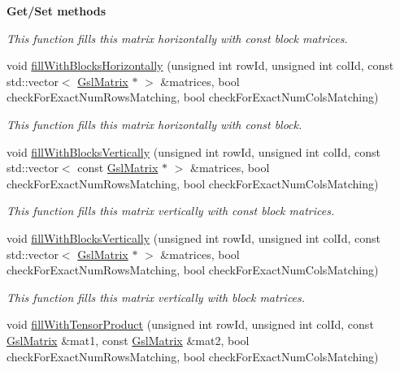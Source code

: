 \begin{Indent}{\bf Get/\-Set methods}
\begin{DoxyCompactItemize}
\begin{DoxyCompactList}\small\item\em This function fills {\ttfamily this} matrix horizontally with const block matrices. \end{DoxyCompactList}\item 
void \hyperlink{class_q_u_e_s_o_1_1_gsl_matrix_ab08b0373565e9c5ffdf7f3b97d2a05c0}{fill\-With\-Blocks\-Horizontally} (unsigned int row\-Id, unsigned int col\-Id, const std\-::vector$<$ \hyperlink{class_q_u_e_s_o_1_1_gsl_matrix}{Gsl\-Matrix} $\ast$ $>$ \&matrices, bool check\-For\-Exact\-Num\-Rows\-Matching, bool check\-For\-Exact\-Num\-Cols\-Matching)
\begin{DoxyCompactList}\small\item\em This function fills {\ttfamily this} matrix horizontally with const block. \end{DoxyCompactList}\item 
void \hyperlink{class_q_u_e_s_o_1_1_gsl_matrix_a872a7a51e6efe08c64eee627572e2505}{fill\-With\-Blocks\-Vertically} (unsigned int row\-Id, unsigned int col\-Id, const std\-::vector$<$ const \hyperlink{class_q_u_e_s_o_1_1_gsl_matrix}{Gsl\-Matrix} $\ast$ $>$ \&matrices, bool check\-For\-Exact\-Num\-Rows\-Matching, bool check\-For\-Exact\-Num\-Cols\-Matching)
\begin{DoxyCompactList}\small\item\em This function fills {\ttfamily this} matrix vertically with const block matrices. \end{DoxyCompactList}\item 
void \hyperlink{class_q_u_e_s_o_1_1_gsl_matrix_adc6102e609373e99b699a666bc3c0aae}{fill\-With\-Blocks\-Vertically} (unsigned int row\-Id, unsigned int col\-Id, const std\-::vector$<$ \hyperlink{class_q_u_e_s_o_1_1_gsl_matrix}{Gsl\-Matrix} $\ast$ $>$ \&matrices, bool check\-For\-Exact\-Num\-Rows\-Matching, bool check\-For\-Exact\-Num\-Cols\-Matching)
\begin{DoxyCompactList}\small\item\em This function fills {\ttfamily this} matrix vertically with block matrices. \end{DoxyCompactList}\item 
void \hyperlink{class_q_u_e_s_o_1_1_gsl_matrix_a41705955dad11afcf59b9cf0c38c14c6}{fill\-With\-Tensor\-Product} (unsigned int row\-Id, unsigned int col\-Id, const \hyperlink{class_q_u_e_s_o_1_1_gsl_matrix}{Gsl\-Matrix} \&mat1, const \hyperlink{class_q_u_e_s_o_1_1_gsl_matrix}{Gsl\-Matrix} \&mat2, bool check\-For\-Exact\-Num\-Rows\-Matching, bool check\-For\-Exact\-Num\-Cols\-Matching)

\end{DoxyCompactItemize}
\end{Indent}
